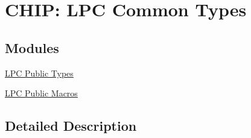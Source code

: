 \hypertarget{group__LPC__Types}{\section{C\-H\-I\-P\-: L\-P\-C Common Types}
\label{group__LPC__Types}
}
\subsection*{Modules}
\begin{DoxyCompactItemize}
\item 
\hyperlink{group__LPC__Types__Public__Types}{L\-P\-C Public Types}
\item 
\hyperlink{group__LPC__Types__Public__Macros}{L\-P\-C Public Macros}
\end{DoxyCompactItemize}


\subsection{Detailed Description}
